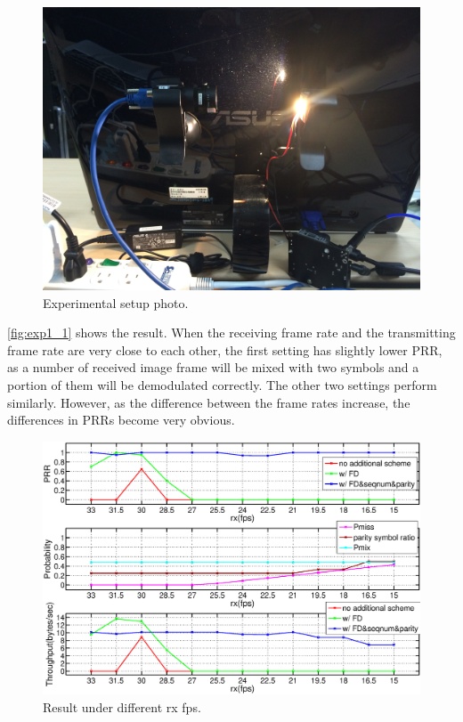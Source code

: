 \begin{figure}[!htb]
  \centering
  \includegraphics[scale=0.0375]{fig/exp1_setup.JPG}
  \caption{Experimental setup photo.}
  \label{fig:exp1_setup}
\end{figure}

\autoref{fig:exp1_1} shows the result. When the receiving frame rate and the transmitting frame rate are very close to each other, the first setting has slightly lower PRR, as a number of received image frame will be mixed with two symbols and a portion of them will be demodulated correctly. The other two settings perform similarly. 
However, as the difference between the frame rates increase, the differences in PRRs become very obvious. 


\begin{figure}[!htb]
  \hspace{-2em}
  \includegraphics[scale=0.25]{fig/exp1_new.eps}
  \caption{Result under different rx fps.}
  \label{fig:exp1_1}
\end{figure}

